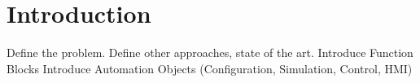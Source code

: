 \chapter{Introduction}
\label{introduction}

Define the problem.
Define other approaches, state of the art.
Introduce Function Blocks
Introduce Automation Objects
(Configuration, Simulation, Control, HMI)
